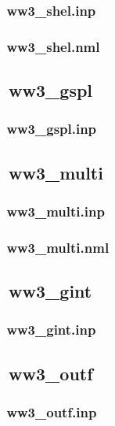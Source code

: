 \subsubsection{~ww3\_shel.inp} \label{sec:config081}
\vsssub
\vsssub
\subsubsection{~ww3\_shel.nml} \label{sec:config082}
\vsssub
\vssub

\vssub
\subsection{~ww3\_gspl}
\vsssub
\subsubsection{~ww3\_gspl.inp} \label{sec:config091}
\vsssub
\vssub

\vssub
\subsection{~ww3\_multi}
\vsssub
\subsubsection{~ww3\_multi.inp} \label{sec:config101}
\vsssub
\vsssub
\subsubsection{~ww3\_multi.nml} \label{sec:config102}
\vsssub
\vssub

\vssub
\subsection{~ww3\_gint}
\vsssub
\subsubsection{~ww3\_gint.inp} \label{sec:config111}
\vsssub
\vssub

\vssub
\subsection{~ww3\_outf}
\vsssub
\subsubsection{~ww3\_outf.inp} \label{sec:config121}
\vsssub
\vssub

